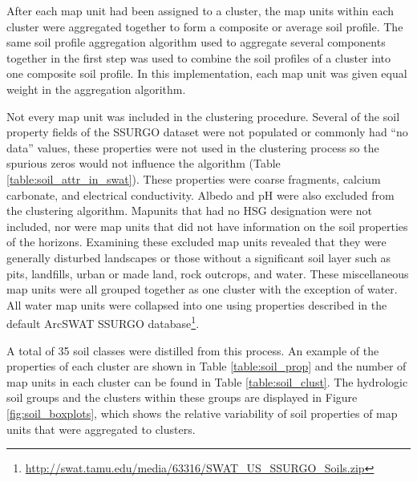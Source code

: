 After each map unit had been assigned to a cluster, the map units within each cluster were
aggregated together to form a composite or average soil profile. 
The same soil profile aggregation algorithm \citep{beaudette_algorithms_2013}
used to aggregate several components together in the first step was used to combine the soil profiles of a cluster into one
composite soil profile. In this implementation, each map unit was given equal
weight in the aggregation algorithm. 

Not every map unit was included in the clustering procedure. Several of the soil property fields of the SSURGO dataset were not populated or commonly had ``no data'' values, these properties were not used in the
clustering process so the spurious zeros would not influence the algorithm (Table \ref{table:soil_attr_in_swat}). These properties were coarse fragments, calcium carbonate, and electrical conductivity. Albedo and pH were also excluded from the clustering algorithm. Mapunits that had no HSG designation were not included, nor were map units that did not have information on the soil properties of the horizons. Examining these excluded map units revealed that they were generally disturbed landscapes or those without a significant soil layer such as pits, landfills, urban or made land, rock outcrops, and water. These miscellaneous map units were all grouped together as one cluster with the exception of water. All water map units were collapsed into one using properties described in the default ArcSWAT SSURGO database\footnote{\url{http://swat.tamu.edu/media/63316/SWAT_US_SSURGO_Soils.zip}}. 

A total of 35 soil classes were distilled from this process. An example of the properties of each cluster are shown in Table \ref{table:soil_prop} and the number of map units in each cluster can be found in Table \ref{table:soil_clust}. The hydrologic soil groups and the clusters within these groups are displayed in Figure \ref{fig:soil_boxplots}, which shows the relative variability of soil properties of map units that were aggregated to clusters.


